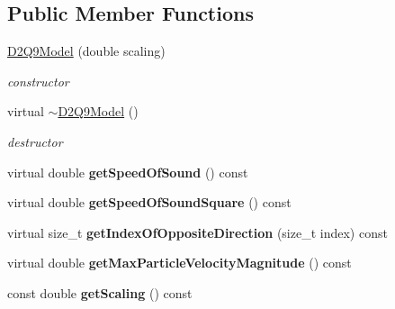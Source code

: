 \subsection*{Public Member Functions}
\begin{DoxyCompactItemize}
\item 
\hypertarget{classnatrium_1_1D2Q9Model_af498c14d311e9172d96b5d962ccc5202}{\hyperlink{classnatrium_1_1D2Q9Model_af498c14d311e9172d96b5d962ccc5202}{D2\-Q9\-Model} (double scaling)}\label{classnatrium_1_1D2Q9Model_af498c14d311e9172d96b5d962ccc5202}

\begin{DoxyCompactList}\small\item\em constructor \end{DoxyCompactList}\item 
\hypertarget{classnatrium_1_1D2Q9Model_aec7d8c160f430e14fbede9ecda368797}{virtual \hyperlink{classnatrium_1_1D2Q9Model_aec7d8c160f430e14fbede9ecda368797}{$\sim$\-D2\-Q9\-Model} ()}\label{classnatrium_1_1D2Q9Model_aec7d8c160f430e14fbede9ecda368797}

\begin{DoxyCompactList}\small\item\em destructor \end{DoxyCompactList}\item 
\hypertarget{classnatrium_1_1D2Q9Model_ac9b53eb73e84ecd13afcf9f3a0b0e195}{virtual double {\bfseries get\-Speed\-Of\-Sound} () const }\label{classnatrium_1_1D2Q9Model_ac9b53eb73e84ecd13afcf9f3a0b0e195}

\item 
\hypertarget{classnatrium_1_1D2Q9Model_aa83e54b682ec7081c298324ee9688a8e}{virtual double {\bfseries get\-Speed\-Of\-Sound\-Square} () const }\label{classnatrium_1_1D2Q9Model_aa83e54b682ec7081c298324ee9688a8e}

\item 
\hypertarget{classnatrium_1_1D2Q9Model_ae29e3df458e24802467ca9c2209cc0ca}{virtual size\-\_\-t {\bfseries get\-Index\-Of\-Opposite\-Direction} (size\-\_\-t index) const }\label{classnatrium_1_1D2Q9Model_ae29e3df458e24802467ca9c2209cc0ca}

\item 
\hypertarget{classnatrium_1_1D2Q9Model_a3e853f0d03f85f2c6eea3bd799c3b040}{virtual double {\bfseries get\-Max\-Particle\-Velocity\-Magnitude} () const }\label{classnatrium_1_1D2Q9Model_a3e853f0d03f85f2c6eea3bd799c3b040}

\item 
\hypertarget{classnatrium_1_1D2Q9Model_a4a72be5ee163c19b9e2a0210ff54cd57}{const double {\bfseries get\-Scaling} () const }\label{classnatrium_1_1D2Q9Model_a4a72be5ee163c19b9e2a0210ff54cd57}

\end{DoxyCompactItemize}
